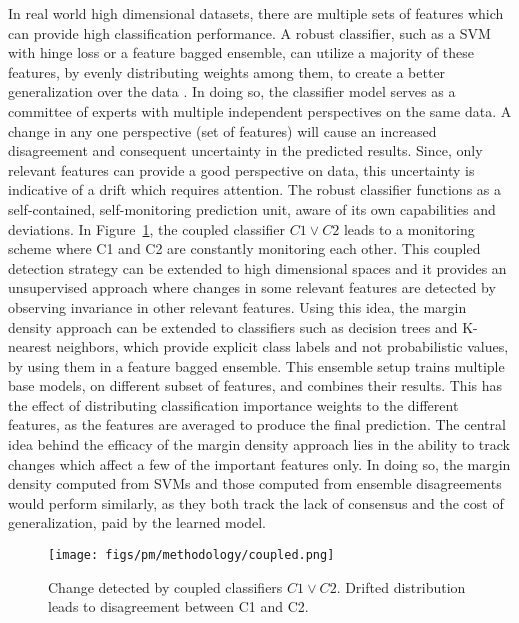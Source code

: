 \documentclass[authoryear,3p,times,twocolumn]{elsarticle}
\begin{document}
In real world high dimensional datasets, there are multiple sets of features which can provide high classification performance. A robust classifier, such as a SVM with hinge loss or a feature bagged ensemble, can utilize a majority of these features, by evenly distributing weights among them, to create a better generalization over the data \citep{skurichina2002bagging,wang2015robust}. In doing so, the classifier model serves as a committee of experts with multiple independent perspectives on the same data. A change in any one perspective (set of features) will cause an increased disagreement and consequent uncertainty in the predicted results. Since, only relevant features can provide a good perspective on data, this uncertainty is indicative of a drift which requires attention. The robust classifier functions as a self-contained, self-monitoring prediction unit, aware of its own capabilities and deviations. In Figure~\ref{fig:coupled}, the coupled classifier $C1 \vee C2$ leads to a monitoring scheme where C1 and C2 are constantly monitoring each other. This coupled detection strategy can be extended to high dimensional spaces and it provides an unsupervised approach where changes in some relevant features are detected by observing invariance in other relevant features. Using this idea, the margin density approach can be extended to classifiers such as decision trees and  K- nearest neighbors, which provide explicit class labels and not probabilistic values, by using them in a feature bagged ensemble. This ensemble setup trains multiple base models, on different subset of features, and combines their results. This has the effect of distributing classification importance weights to the different features, as the features are averaged to produce the final prediction. The central idea behind the efficacy of the margin density approach lies in the ability to track changes which affect a few of the important features only. In doing so, the margin density computed from SVMs and those computed from ensemble disagreements would perform similarly, as they both track the lack of consensus and the cost of generalization, paid by the learned model. 


\begin{figure}[t]
  \centering
  \texttt{[image: figs/pm/methodology/coupled.png]}
   \caption{Change detected by coupled classifiers $C1\vee C2$. Drifted distribution leads to disagreement between C1 and C2. }
  \label{fig:coupled}
\end{figure}
\end{document}
